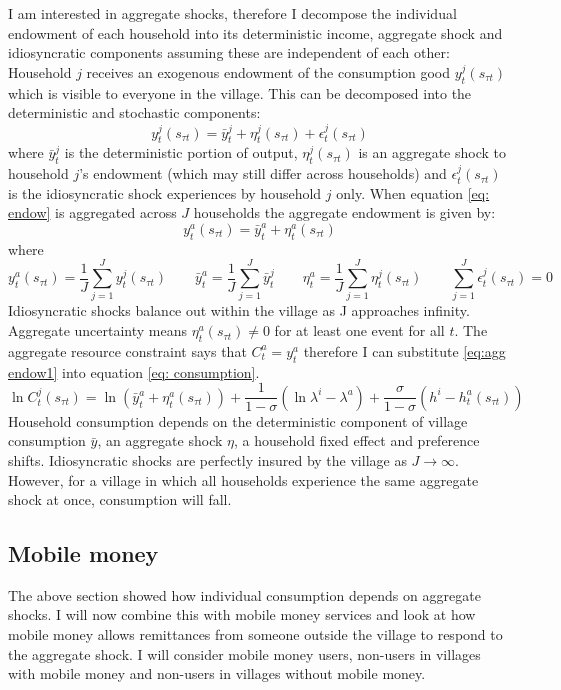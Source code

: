 I am interested in aggregate shocks, therefore I decompose the individual endowment of each household into its deterministic income, aggregate shock and idiosyncratic components assuming these are independent of each other:
Household $j$ receives an exogenous endowment of the consumption good $y^j_t(s_{\tau t})$ which is visible to everyone in the village. This can be decomposed into the deterministic and stochastic components: 
\begin{equation} \label{eq: endow}
y^j_t(s_{\tau t}) = \bar{y}^j_t + \eta_t^j(s_{\tau t}) + \epsilon_t^j(s_{\tau t})
\end{equation}
where $\bar{y}^j_t$ is the deterministic portion of output, $\eta_t^j(s_{\tau t})$ is an aggregate shock to household $j$'s endowment (which may still differ across households) and $\epsilon_t^j(s_{\tau t})$ is the idiosyncratic shock experiences by household $j$ only. When equation \eqref{eq: endow} is aggregated across $J$ households the aggregate endowment is given by:
\begin{equation} \label{eq:agg endow1}
y^a_t(s_{\tau t}) = \bar{y}^a_t + \eta_t^a(s_{\tau t})
\end{equation}
where 
\[
y^a_t(s_{\tau t})= \frac{1}{J}\sum_{j=1}^Jy^j_t(s_{\tau t}) \qquad \bar{y}^a_t= \frac{1}{J}\sum_{j=1}^J \bar{y}^j_t \qquad  \eta^a_t=\frac{1}{J}\sum_{j=1}^J\eta_t^j(s_{\tau t}) \qquad \sum_{j=1}^J \epsilon_t^j(s_{\tau t})=0
\]
Idiosyncratic shocks balance out within the village as J approaches infinity. Aggregate uncertainty means $\eta_t^a(s_{\tau t}) \neq 0$ for at least one event for all $t$. The aggregate resource constraint says that $C^a_t=y^a_t$ therefore I can substitute \eqref{eq:agg endow1} into equation \eqref{eq: consumption}. 
\begin{equation} \label{eq: agg shock}
\ln C_t^j(s_{\tau t}) = \ln (\bar{y}^a_t + \eta_t^a(s_{\tau t})) + \frac{1}{1-\sigma}(\ln \lambda^i- \lambda^a) + \frac{\sigma}{1-\sigma}(h^i- h^a_t(s_{\tau t}))
\end{equation}
Household consumption depends on the deterministic component of village consumption $\bar{y}$, an aggregate shock $\eta$, a household fixed effect and preference shifts. Idiosyncratic shocks are perfectly insured by the village as $J \rightarrow \infty$. However, for a village in which all households experience the same aggregate shock at once, consumption will fall. 

\subsection{Mobile money}
The above section showed how individual consumption depends on aggregate shocks. I will now combine this with mobile money services and look at how mobile money allows remittances from someone outside the village to respond to the aggregate shock. I will consider mobile money users, non-users in villages with mobile money and non-users in villages without mobile money. 

